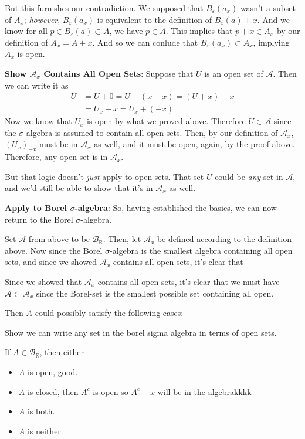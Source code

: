 \documentclass[12pt]{article}
\theoremstyle{plain}
\theoremstyle{definition}
\theoremstyle{remark}
\begin{document}
\begin{enumerate}
But this furnishes our contradiction.  We supposed that $B_\varepsilon(a_x)$ wasn't a subset of $A_x$; \emph{however}, $B_\varepsilon(a_x)$ is equivalent to the definition of $B_\varepsilon(a) + x$. And we know for all $p \in B_\varepsilon(a)\subset A$, we have $p\in A$. This implies that $p+x \in A_x$ by our definition of $A_x = A+x$. And so we can conlude that $B_\varepsilon(a_x)\subset A_x$, implying $A_x$ is open.

\textbf{Show $\mathscr{A}_x$ Contains All Open Sets}: Suppose that $U$ is an open set of $\mathscr{A}$. Then we can write it as
\begin{align*}
    U &= U + 0 = U + (x-x) = (U + x) - x \\
    &= U_x - x = U_x + (-x)
\end{align*}
Now we know that $U_x$ is open by what we proved above. Therefore $U\in\mathscr{A}$ since the $\sigma$-algebra is assumed to contain all open sets. Then, by our definition of $\mathscr{A}_x$, $\left(U_x\right)_{-x}$ must be in $\mathscr{A}_x$ as well, and it must be open, again, by the proof above. Therefore, any open set is in $\mathscr{A}_x$.

But that logic doesn't \emph{just} apply to open sets. That set $U$ could be \emph{any} set in $\mathscr{A}$, and we'd still be able to show that it's in $\mathscr{A}_x$ as well.

\textbf{Apply to Borel $\sigma$-algebra}: So, having established the basics, we can now return to the Borel $\sigma$-algebra. 

Set $\mathscr{A}$ from above to be $\mathscr{B}_\mathbb{R}$. Then, let $\mathscr{A}_x$ be defined according to the definition above.  Now since the Borel $\sigma$-algebra is the smallest algebra containing all open sets, and since we showed $\mathscr{A}_x$ contains all open sets, it's clear that 

Since we showed that $\mathscr{A}_x$ contains all open sets, it's clear that we must have $\mathscr{A}\subset \mathscr{A}_x$ since the Borel-set is the smallest possible set containing all open. 


Then $A$ could possibly satisfy the following cases:

Show we can write any set in the borel sigma algebra in terms of open sets.
 
If $A\in\mathscr{B}_\mathbb{R}$, then either
\begin{itemize}
    \item $A$ is open, good.
    \item $A$ is closed, then $A^c$ is open so $A^c + x$ will be in the algebrakkkk
    \item $A$ is both.
    \item $A$ is neither.
\end{itemize}

\end{enumerate}
\end{document}
